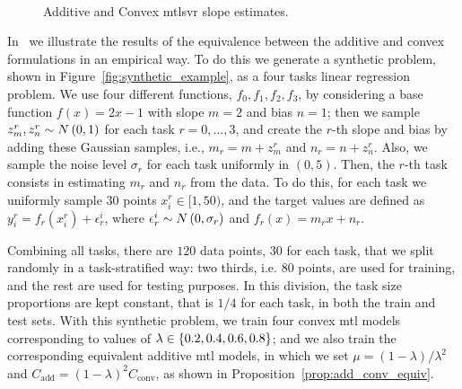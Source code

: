 \begin{figure}[t!]
    \centering
    \quad%
    \\
    \caption{Additive and Convex \acrshort{mtl}\acrshort{svr} slope estimates.}
    \label{fig:synthetic_specWeights}
\end{figure}




In~\citet{RuizAD19} we illustrate the results of the equivalence between the additive and convex formulations in an empirical way. To do this we generate a synthetic problem, shown in Figure~\ref{fig:synthetic_example}, as a four tasks linear regression problem. 
%
We use four different functions, $f_0, f_1, f_2, f_3$, by considering a base function $f(x) = 2x - 1$ with slope $m=2$ and bias $n=1$; then we sample $z_m^r, z_n^r \sim N \left(0, 1\right)$ for each task $r=0, \ldots, 3$, and create the $r$-th slope and bias by adding these Gaussian samples, i.e., $m_r = m + z_m^r$ and $n_r = n + z_n^r$. Also, we sample the noise level $\sigma_r$ for each task uniformly in $(0, 5)$. 
%
Then, the $r$-th task consists in estimating $m_r$ and $n_r$ from the data. To do this, for each task we uniformly sample $30$ points $x_i^r \in [1, 50)$, and the target values are defined as $y_i^r = f_r(x_i^r) + \epsilon^i_r$, where $\epsilon^i_r \sim N \left(0, \sigma_r\right)$ and $f_r(x) = m_r x + n_r$.
%

Combining all tasks, there are $120$ data points, $30$ for each task, that we split randomly in a task-stratified way: two thirds, i.e. $80$ points, are used for training, and the rest are used for testing purposes. In this division, the task size proportions are kept constant, that is $1/4$ for each task, in both the train and test sets. 
%
With this synthetic problem, we train four convex \acrshort{mtl} models corresponding to values of $\lambda \in \left\{0.2, 0.4, 0.6, 0.8\right\}$; and we also train the corresponding equivalent additive \acrshort{mtl} models, in which we set $\mu = (1 - \lambda)/\lambda^2$ and $C_\text{add} = (1 - \lambda)^2 C_\text{conv}$, as shown in Proposition~\ref{prop:add_conv_equiv}.
%

